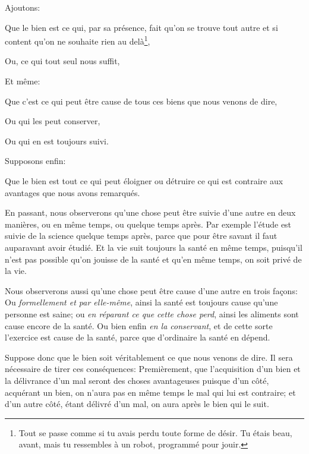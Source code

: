 Ajoutons:

\begin{emphpar}
     Que le bien est ce qui, par sa présence, fait qu'on se trouve tout autre et si content qu'on ne souhaite rien au
	 delà\footnote{Tout se passe comme si tu avais perdu toute forme de désir. Tu étais beau, avant, mais tu ressembles
	 à un robot, programmé pour jouir.},

     Ou, ce qui tout seul nous suffit,
\end{emphpar}

Et même:

\begin{emphpar}
     Que c'est ce qui peut être cause de tous ces biens que nous venons de dire,

	 Ou qui les peut conserver,

	 Ou qui en est toujours suivi.
\end{emphpar}

\bigbreak

Supposons enfin:

\begin{emphpar}
     Que le bien est tout ce qui peut éloigner ou détruire ce qui est contraire aux avantages que nous avons remarqués.
\end{emphpar}

En passant, nous observerons qu'une chose peut être suivie d'une autre en deux manières, ou en même temps, ou quelque temps
après. Par exemple l'étude est suivie de la science quelque temps après, parce que pour être savant il faut auparavant
avoir étudié. Et la vie suit toujours la santé en même temps, puisqu'il n'est pas possible qu'on jouisse de la santé et
qu'en même temps, on soit privé de la vie.

Nous observerons aussi qu'une chose peut être cause d'une autre en trois façons: Ou \emph{formellement et par elle-même},
ainsi la santé est toujours cause qu'une personne est saine; ou \emph{en réparant ce que cette chose perd}, ainsi les
aliments sont cause encore de la santé. Ou bien enfin \emph{en la conservant}, et de cette sorte l'exercice est cause de
la santé, parce que d'ordinaire la santé en dépend.

\bigbreak

Suppose donc que le bien soit véritablement ce que nous venons de dire. Il sera nécessaire de tirer ces conséquences:
Premièrement, que l'acquisition d'un bien et la délivrance d'un mal seront des choses avantageuses puisque d'un côté,
acquérant un bien, on n'aura pas en même temps le mal qui lui est contraire; et d'un autre côté, étant délivré d'un
mal, on aura après le bien qui le suit. 


